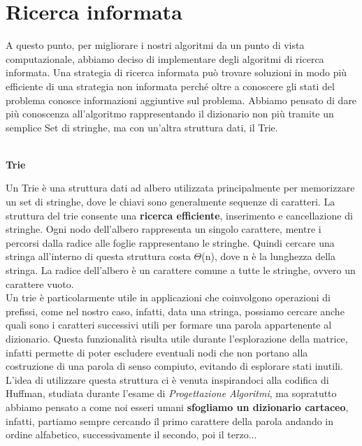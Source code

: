 \documentclass[10pt,a4paper]{article}
\begin{document}
	\section{Ricerca informata}
	A questo punto, per migliorare i nostri algoritmi da un punto di vista computazionale, abbiamo deciso di implementare degli algoritmi di ricerca informata.
	Una strategia di ricerca informata può trovare soluzioni in modo più efficiente di una strategia non informata perché oltre a conoscere gli stati del problema conosce informazioni aggiuntive sul problema. Abbiamo pensato di dare più conoscenza all'algoritmo rappresentando il dizionario non più tramite un semplice Set di stringhe, ma con un'altra struttura dati, il Trie.\\\\
	\begin{large}
		\textbf{Trie}\\
	\end{large}
	Un Trie è una struttura dati ad albero utilizzata principalmente per memorizzare un set di stringhe, dove le chiavi sono generalmente sequenze di caratteri. La struttura del trie consente una \textbf{ricerca efficiente}, inserimento e cancellazione di stringhe. Ogni nodo dell'albero rappresenta un singolo carattere, mentre i percorsi dalla radice alle foglie rappresentano le stringhe. Quindi cercare una stringa all'interno di questa struttura costa $\Theta$(n), dove n è la lunghezza della stringa. La radice dell'albero è un carattere comune a tutte le stringhe, ovvero un carattere vuoto.\\
	Un trie è particolarmente utile in applicazioni che coinvolgono operazioni di prefissi, come nel nostro caso, infatti, data una stringa, possiamo cercare anche quali sono i caratteri successivi utili per formare una parola appartenente al dizionario. Questa funzionalità risulta utile durante l'esplorazione della matrice, infatti permette di poter escludere eventuali nodi che non portano alla costruzione di una parola di senso compiuto, evitando di esplorare stati inutili.
	L'idea di utilizzare questa struttura ci è venuta inspirandoci alla codifica di Huffman, studiata durante l'esame di \textit{Progettazione Algoritmi}, ma sopratutto abbiamo pensato a come noi esseri umani \textbf{sfogliamo un dizionario cartaceo}, infatti, partiamo sempre cercando il primo carattere della parola andando in ordine alfabetico, successivamente il secondo, poi il terzo...
\end{document}
